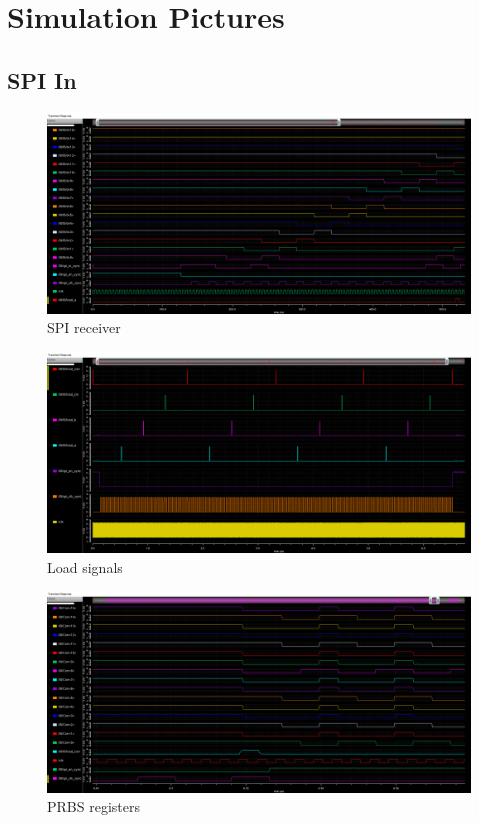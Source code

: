 \section{Simulation Pictures}

\subsection{SPI In}

\begin{figure}[H]
  \centering
  \captionsetup{justification=centering}
  \includegraphics[angle=90, scale=0.44]{../figures/test2_spi_in}
  \caption{SPI receiver} 
\end{figure}

\begin{figure}[H]
  \centering
  \captionsetup{justification=centering}
  \includegraphics[angle=90, scale=0.46]{../figures/test2_spi_load}
  \caption{Load signals}
\end{figure}

\begin{figure}[H]
  \centering
  \captionsetup{justification=centering}
  \includegraphics[angle=90, scale=0.46]{../figures/test2_spi_abc}
  \caption{PRBS registers}
\end{figure}

